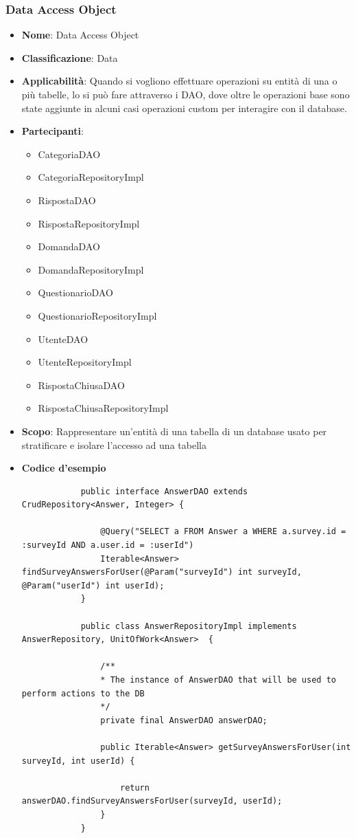 \documentclass[12pt]{article}
\begin{document}
	\subsubsection{Data Access Object}
	\begin{itemize}
		\item \textbf{Nome}: Data Access Object
		\item \textbf{Classificazione}: Data
		\item \textbf{Applicabilità}: Quando si vogliono effettuare operazioni su entità di una o più tabelle, lo si può fare attraverso i DAO, dove oltre le operazioni base sono state aggiunte in alcuni casi operazioni custom per interagire con il database.
		\item \textbf{Partecipanti}:
		\begin{itemize}
			\item CategoriaDAO
			\item CategoriaRepositoryImpl
			\item RispostaDAO
			\item RispostaRepositoryImpl
			\item DomandaDAO
			\item DomandaRepositoryImpl
			\item QuestionarioDAO
			\item QuestionarioRepositoryImpl
			\item UtenteDAO
			\item UtenteRepositoryImpl
			\item RispostaChiusaDAO
			\item RispostaChiusaRepositoryImpl
		\end{itemize}
		\item \textbf{Scopo}: Rappresentare un'entità di una tabella di un database usato per stratificare e isolare l'accesso ad una tabella
		\item \textbf{Codice d'esempio}
		\begin{lstlisting}
			public interface AnswerDAO extends CrudRepository<Answer, Integer> {
				
				@Query("SELECT a FROM Answer a WHERE a.survey.id = :surveyId AND a.user.id = :userId")
				Iterable<Answer> findSurveyAnswersForUser(@Param("surveyId") int surveyId, @Param("userId") int userId);
			}
			
			public class AnswerRepositoryImpl implements AnswerRepository, UnitOfWork<Answer>  {
				
				/**
				* The instance of AnswerDAO that will be used to perform actions to the DB
				*/
				private final AnswerDAO answerDAO;
				
				public Iterable<Answer> getSurveyAnswersForUser(int surveyId, int userId) {
					
					return answerDAO.findSurveyAnswersForUser(surveyId, userId);
				}
			}
		\end{lstlisting}
	\end{itemize}
	
\end{document}
